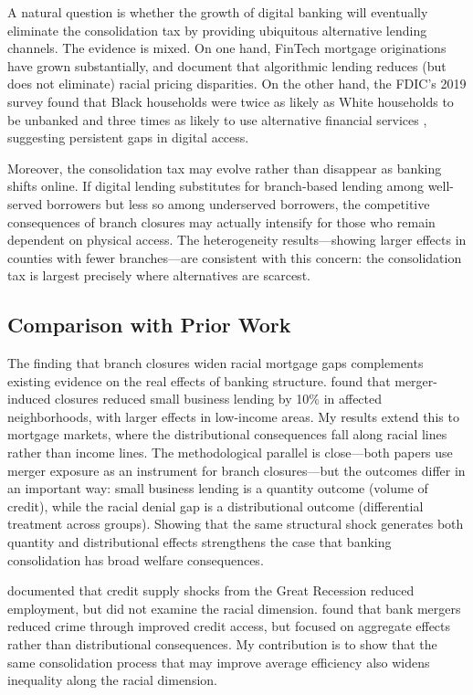 \documentclass[12pt]{article}
\begin{document}
A natural question is whether the growth of digital banking will eventually eliminate the consolidation tax by providing ubiquitous alternative lending channels. The evidence is mixed. On one hand, FinTech mortgage originations have grown substantially, and \citet{bartlett2022} document that algorithmic lending reduces (but does not eliminate) racial pricing disparities. On the other hand, the FDIC's 2019 survey found that Black households were twice as likely as White households to be unbanked and three times as likely to use alternative financial services \citep{fdic2019}, suggesting persistent gaps in digital access.

Moreover, the consolidation tax may evolve rather than disappear as banking shifts online. If digital lending substitutes for branch-based lending among well-served borrowers but less so among underserved borrowers, the competitive consequences of branch closures may actually intensify for those who remain dependent on physical access. The heterogeneity results---showing larger effects in counties with fewer branches---are consistent with this concern: the consolidation tax is largest precisely where alternatives are scarcest.

\subsection{Comparison with Prior Work}

The finding that branch closures widen racial mortgage gaps complements existing evidence on the real effects of banking structure. \citet{nguyen2019} found that merger-induced closures reduced small business lending by 10\% in affected neighborhoods, with larger effects in low-income areas. My results extend this to mortgage markets, where the distributional consequences fall along racial lines rather than income lines. The methodological parallel is close---both papers use merger exposure as an instrument for branch closures---but the outcomes differ in an important way: small business lending is a quantity outcome (volume of credit), while the racial denial gap is a distributional outcome (differential treatment across groups). Showing that the same structural shock generates both quantity and distributional effects strengthens the case that banking consolidation has broad welfare consequences.

\citet{greenstone2020} documented that credit supply shocks from the Great Recession reduced employment, but did not examine the racial dimension. \citet{garmaise2006} found that bank mergers reduced crime through improved credit access, but focused on aggregate effects rather than distributional consequences. My contribution is to show that the same consolidation process that may improve average efficiency also widens inequality along the racial dimension.
\end{document}
